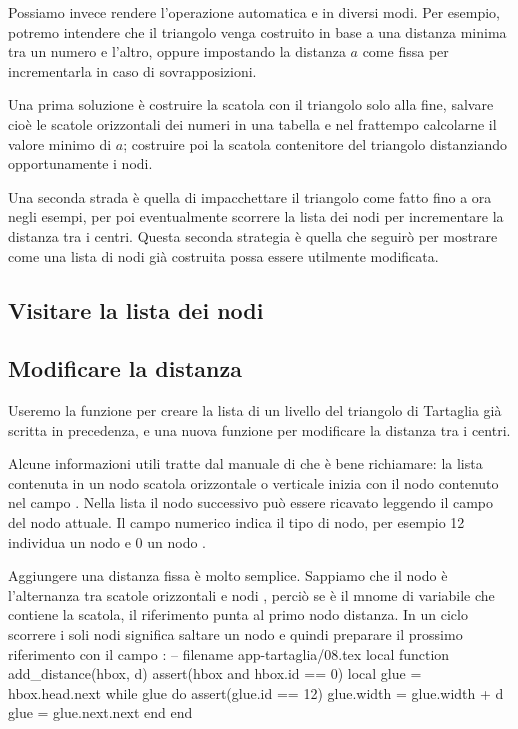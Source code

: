 Possiamo invece rendere l'operazione automatica e in diversi modi. Per esempio,
potremo intendere che il triangolo venga costruito in base a una distanza minima
tra un numero e l'altro, oppure impostando la distanza \( a \) come fissa per
incrementarla in caso di sovrapposizioni.

Una prima soluzione è costruire la scatola con il triangolo solo alla fine,
salvare cioè le scatole orizzontali dei numeri in una tabella e nel frattempo
calcolarne il valore minimo di \( a \); costruire poi la scatola contenitore del
triangolo distanziando opportunamente i nodi.

Una seconda strada è quella di impacchettare il triangolo come fatto fino a ora
negli esempi, per poi eventualmente scorrere la lista dei nodi per incrementare
la distanza tra i centri. Questa seconda strategia è quella che seguirò per
mostrare come una lista di nodi già costruita possa essere utilmente
modificata.


\subsection{Visitare la lista dei nodi}


\subsection{Modificare la distanza}

Useremo la funzione  per creare la lista di un livello del
triangolo di Tartaglia già scritta in precedenza, e una nuova funzione
 per modificare la distanza tra i centri.

Alcune informazioni utili tratte dal manuale di \LuaTeX{} che è bene richiamare:
la lista contenuta in un nodo scatola orizzontale o verticale inizia con il nodo
contenuto nel campo . Nella lista il nodo successivo può essere
ricavato leggendo il campo  del nodo attuale. Il campo numerico
 indica il tipo di nodo, per esempio 12 individua un nodo  e
0 un nodo .

Aggiungere una distanza fissa è molto semplice. Sappiamo che il nodo 
è l'alternanza tra scatole orizzontali e nodi , perciò se 
è il mnome di variabile che contiene la scatola, il riferimento
 punta al primo nodo distanza. In un ciclo 
scorrere i soli nodi  significa saltare un nodo e quindi preparare il
prossimo riferimento con il campo :
\lines
-- filename app-tartaglia/08.tex
local function add_distance(hbox, d)
    assert(hbox and hbox.id == 0)
    local glue = hbox.head.next
    while glue do
        assert(glue.id == 12)
        glue.width = glue.width + d
        glue = glue.next.next
    end
end
\endlines
{}

